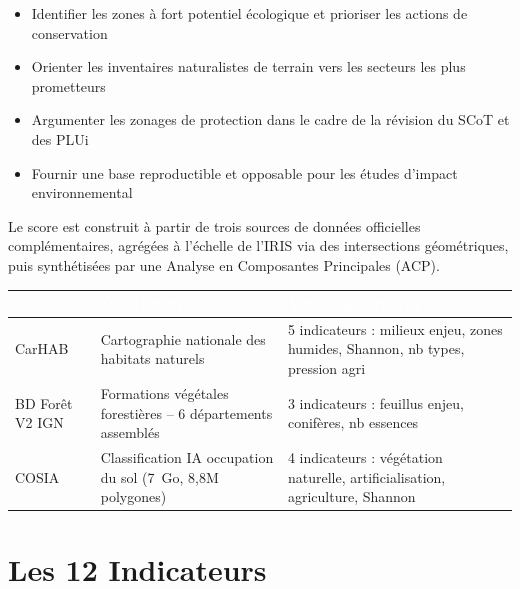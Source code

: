 \documentclass[11pt,a4paper]{report}
\begin{document}
\begin{itemize}[leftmargin=1.5cm]
  \item Identifier les zones à fort potentiel écologique et prioriser les actions de conservation
  \item Orienter les inventaires naturalistes de terrain vers les secteurs les plus prometteurs
  \item Argumenter les zonages de protection dans le cadre de la révision du SCoT et des PLUi
  \item Fournir une base reproductible et opposable pour les études d'impact environnemental
\end{itemize}

\vspace{0.4cm}
Le score est construit à partir de trois sources de données officielles complémentaires, agrégées à l'échelle de l'IRIS via des intersections géométriques, puis synthétisées par une Analyse en Composantes Principales (ACP).

\vspace{0.6cm}
\begin{tabularx}{\textwidth}{L{2.5cm} L{3.5cm} X}
  \toprule
  \textcolor{white}{\textbf{Source}} &
  \textcolor{white}{\textbf{Description}} &
  \textcolor{white}{\textbf{Variables extraites}} \\
  \midrule
  CarHAB & Cartographie nationale des habitats naturels &
    5 indicateurs : milieux enjeu, zones humides, Shannon, nb types, pression agri \\
  BD Forêt V2 IGN & Formations végétales forestières -- 6 départements assemblés &
    3 indicateurs : feuillus enjeu, conifères, nb essences \\
  COSIA & Classification IA occupation du sol (7~Go, 8,8M polygones) &
    4 indicateurs : végétation naturelle, artificialisation, agriculture, Shannon \\
  \bottomrule
\end{tabularx}

\section{Les 12 Indicateurs}
\end{document}
